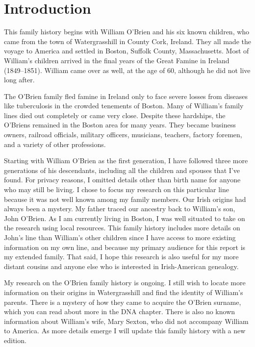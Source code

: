 \chapter{Introduction}

This family history begins with William O'Brien and his six known children, who came from the town of Watergrasshill in County Cork, Ireland. They all made the voyage to America and settled in Boston, Suffolk County, Massachusetts. Most of William's children arrived in the final years of the Great Famine in Ireland (1849--1851). William came over as well, at the age of 60, although he did not live long after.

The O'Brien family fled famine in Ireland only to face severe losses from diseases like tuberculosis in the crowded tenements of Boston. Many of William's family lines died out completely or came very close. Despite these hardships, the O'Briens remained in the Boston area for many years. They became business owners, railroad officials, military officers, musicians, teachers, factory foremen, and a variety of other professions.

Starting with William O'Brien as the first generation, I have followed three more generations of his descendants, including all the children and spouses that I've found. For privacy reasons, I omitted details other than birth name for anyone who may still be living. I chose to focus my research on this particular line because it was not well known among my family members. Our Irish origins had always been a mystery. My father traced our ancestry back to William's son, John O'Brien. As I am currently living in Boston, I was well situated to take on the research using local resources. This family history includes more details on John's line than William's other children since I have access to more existing information on my own line, and because my primary audience for this report is my extended family. That said, I hope this research is also useful for my more distant cousins and anyone else who is interested in Irish-American genealogy. 

My research on the O'Brien family history is ongoing. I still wish to locate more information on their origins in Watergrasshill and find the identity of William's parents. There is a mystery of how they came to acquire the O'Brien surname, which you can read about more in the DNA chapter. There is also no known information about William's wife, Mary Sexton, who did not accompany William to America. As more details emerge I will update this family history with a new edition.

